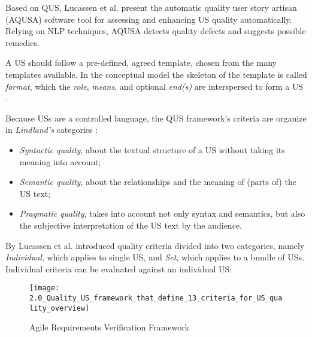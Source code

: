 Based on QUS, Lucassen et al. present the automatic quality user story artisan (AQUSA) software tool for assessing and enhancing US quality automatically. Relying on NLP techniques, AQUSA detects quality defects and suggests possible remedies.

A US should follow a pre-defined, agreed template, chosen from the many templates available. In the conceptual model the skeleton of the template is called \emph{format}, which the \emph{role}, \emph{means}, and optional \emph{end(s)} are interspersed to form a US \cite{wautelet2014unifying}. 

Because USs are a controlled language, the QUS framework’s criteria are organize in \emph{Lindland’s} categories \cite{lindland1994understanding}:

\begin{itemize}
\item\emph{ Syntactic quality}, about the textual structure of a US without taking its meaning into account;
\item\emph{Semantic quality}, about the relationships and the meaning of (parts of) the US text;
\item\emph{Pragmatic quality}, takes into account not only syntax and semantics, but also the subjective interpretation of the US text by the audience.
\end{itemize}

By Lucassen et al. introduced quality criteria divided into two categories, namely \emph{Individual}, which applies to single US, and \emph{Set}, which applies to a bundle of USs. Individual criteria can be evaluated against an individual US:


\begin{figure}[h]
\center
\texttt{[image: 2.0\_Quality\_US\_framework\_that\_define\_13\_criteria\_for\_US\_quality\_overview]}
\caption{Agile Requirements Verification Framework \cite{lucassen2016improving}}\label{fig:qus_framework}
\end{figure}

